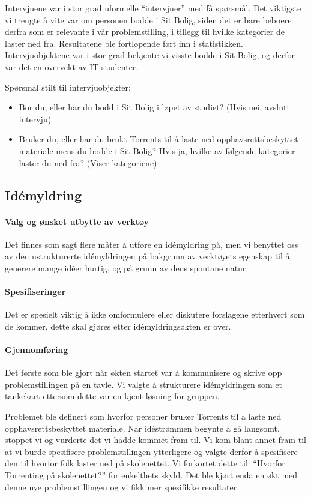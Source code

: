 Intervjuene var i stor grad uformelle ``intervjuer'' med få spørsmål. Det viktigste vi trengte å vite var om personen bodde i Sit Bolig, siden det er bare beboere derfra som er relevante i vår problemstilling, i tillegg til hvilke kategorier de laster ned fra. Resultatene ble fortløpende ført inn i statistikken. Intervjuobjektene var i stor grad bekjente vi visste bodde i Sit Bolig, og derfor var det en overvekt av IT studenter.

Spørsmål stilt til intervjuobjekter:
\begin{itemize}
    \item Bor du, eller har du bodd i Sit Bolig i løpet av studiet? (Hvis nei, avslutt intervju)
    \item Bruker du, eller har du brukt Torrents til å laste ned opphavsrettsbeskyttet materiale mens du bodde i Sit Bolig? Hvis ja, hvilke av følgende kategorier laster du ned fra? (Viser kategoriene)
\end{itemize}


\subsection{Idémyldring}

\paragraph{Valg og ønsket utbytte av verktøy}
Det finnes som sagt flere måter å utføre en idémyldring på, men vi benyttet oss av den ustrukturerte idémyldringen på bakgrunn av verktøyets egenskap til å generere mange idéer hurtig, og på grunn av dens spontane natur. 

\paragraph{Spesifiseringer}
Det er spesielt viktig å ikke omformulere eller diskutere forslagene etterhvert som de kommer, dette skal gjøres etter idémyldringsøkten er over.

\paragraph{Gjennomføring}
Det første som ble gjort når økten startet var å kommunisere og skrive opp problemstillingen på en tavle. Vi valgte å strukturere idémyldringen som et tankekart ettersom dette var en kjent løsning for gruppen. 

Problemet ble definert som hvorfor personer bruker Torrents til å laste ned opphavsrettsbeskyttet materiale. Når idéstrømmen begynte å gå langsomt, stoppet vi og vurderte det vi hadde kommet fram til. Vi kom blant annet fram til at vi burde spesifisere problemstillingen ytterligere og valgte derfor å spesifisere den til hvorfor folk laster ned på skolenettet. Vi forkortet dette til: ``Hvorfor Torrenting på skolenettet?'' for enkelthets skyld. Det ble kjørt enda en økt med denne nye problemstillingen og vi fikk mer spesifikke resultater.


